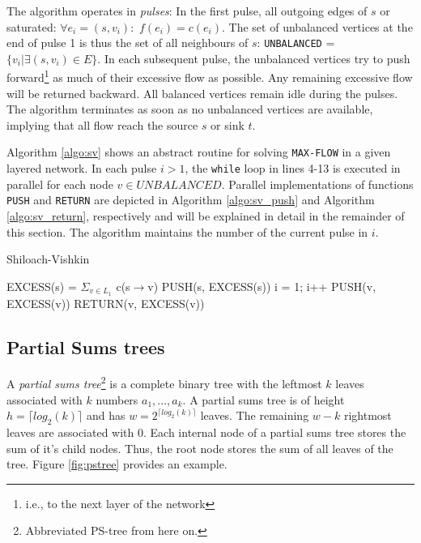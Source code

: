 \documentclass[a4paper,10pt, twocolumn]{article}
\begin{document}
The algorithm operates in \emph{pulses}: In the first pulse, all outgoing edges of $s$ or saturated: $\forall e_i = (s, v_i):$ $f(e_i) = c(e_i)$. The set of unbalanced vertices at the end of pulse 1 is thus the set of all neighbours of $s$: \lstinline|UNBALANCED| = $\{v_i\lvert \exists (s, v_i) \in E \}$. In each subsequent pulse, the unbalanced vertices try to push forward\footnote{i.e., to the next layer of the network} as much of their excessive flow as possible. Any remaining excessive flow will be returned backward. All balanced vertices remain idle during the pulses. The algorithm terminates as soon as no unbalanced vertices are available, implying that all flow reach the source $s$ or sink $t$.

Algorithm \ref{algo:sv} shows an abstract routine for solving \lstinline|MAX-FLOW| in a given layered network. In each pulse $i>1$, the \lstinline|while| loop in lines 4-13 is executed in parallel for each node $v \in UNBALANCED$. Parallel implementations of functions \lstinline|PUSH| and \lstinline|RETURN| are depicted in Algorithm \ref{algo:sv_push} and Algorithm \ref{algo:sv_return}, respectively and will be explained in detail in the remainder of this section. The algorithm maintains the number of the current pulse in $i$.

\begin{algorithm}
\caption{Shiloach-Vishkin}
\label{algo:sv}
\begin{algorithmic}[1]
		\State EXCESS(s) = $\Sigma_{v \in L_1}$ c(s$\rightarrow$v)
		\State PUSH(s, EXCESS(s))
		i = 1;
			\State i++
					\State PUSH(v, EXCESS(v))
				\EndIf
			\EndFor
			\State RETURN(v, EXCESS(v))
		\EndWhile
	\EndFunction
\end{algorithmic}
\end{algorithm}

\subsection{Partial Sums trees}
\label{sec:sv_pstrees}
A \emph{partial sums tree}\footnote{Abbreviated PS-tree from here on.} is a complete binary tree with the leftmost $k$ leaves associated with $k$ numbers $a_1,...,a_k$. A partial sums tree is of height $h = \lceil log_2(k) \rceil$ and has $w = 2^{\lceil log_2(k) \rceil}$ leaves. The remaining $w - k$ rightmost leaves are associated with 0. Each internal node of a partial sums tree stores the sum of it's child nodes. Thus, the root node stores the sum of all leaves of the tree. Figure \ref{fig:pstree} provides an example.
\end{document}
